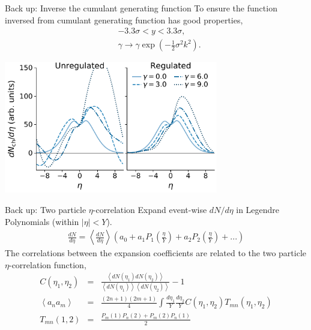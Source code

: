 \documentclass[11pt]{beamer}
\begin{document}
\begin{frame}[noframenumbering]{Back up: Inverse the cumulant generating function}
To ensure the function inversed from cumulant generating function has good properties, 
\begin{eqnarray}
&-3.3\sigma < y < 3.3\sigma, \\
&\gamma \rightarrow \gamma\exp\left(-\frac{1}{2}\sigma^2k^2\right).
\end{eqnarray}
\begin{center}
\includegraphics[width=0.7\textwidth]{regulate.pdf}
\end{center}
\end{frame}

\begin{frame}[noframenumbering]{Back up: Two particle $\eta$-correlation}
Expand event-wise $dN/d\eta$ in Legendre Polynomials (within $|\eta|<Y$). 
\begin{eqnarray}
\nonumber
\frac{dN}{d\eta} = \left\langle \frac{dN}{d\eta} \right\rangle \left(a_0 + a_1 P_1\left(\frac{\eta}{Y}\right) + a_2 P_2\left(\frac{\eta}{Y}\right) + ...\right)
\end{eqnarray}
The correlations between the expansion coefficients are related to the two particle $\eta$-correlation function,
\begin{eqnarray}
\nonumber
C(\eta_1,\eta_2) &=& \frac{\left\langle dN(\eta_1)dN(\eta_2)\right\rangle}{\left\langle dN(\eta_1)\right\rangle\left\langle dN(\eta_2)\right\rangle}-1\\
\nonumber
\left\langle a_n a_m\right\rangle &=& \frac{(2n+1)(2m+1)}{4} \int \frac{d\eta_1}{Y}\frac{d\eta_2}{Y} C(\eta_1,\eta_2)T_{mn}(\eta_1,\eta_2)\\
T_{mn}(1,2) &=& \frac{P_m(1)P_n(2)+P_m(2)P_n(1)}{2}
\end{eqnarray}
\end{frame}
\end{document}
